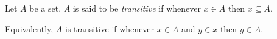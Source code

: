 \documentclass[12pt]{article}
\begin{document}
Let $A$ be a set.  $A$ is said to be \emph{transitive} if whenever $x\in A$ then $x\subseteq A$.

Equivalently, $A$ is transitive if whenever $x\in A$ and $y\in x$ then $y\in A$.
\end{document}
